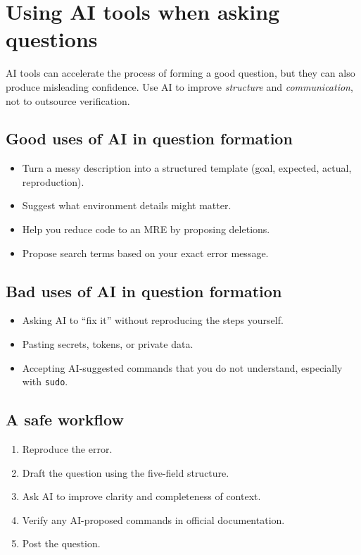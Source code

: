 \section{Using AI tools when asking questions}
AI tools can accelerate the process of forming a good question, but they can also produce misleading confidence. Use AI to improve \emph{structure} and \emph{communication}, not to outsource verification.

\subsection{Good uses of AI in question formation}
\begin{itemize}[noitemsep]
  \item Turn a messy description into a structured template (goal, expected, actual, reproduction).
  \item Suggest what environment details might matter.
  \item Help you reduce code to an MRE by proposing deletions.
  \item Propose search terms based on your exact error message.
\end{itemize}

\subsection{Bad uses of AI in question formation}
\begin{itemize}[noitemsep]
  \item Asking AI to ``fix it'' without reproducing the steps yourself.
  \item Pasting secrets, tokens, or private data.
  \item Accepting AI-suggested commands that you do not understand, especially with \texttt{sudo}.
\end{itemize}

\subsection{A safe workflow}
\begin{enumerate}[noitemsep]
  \item Reproduce the error.
  \item Draft the question using the five-field structure.
  \item Ask AI to improve clarity and completeness of context.
  \item Verify any AI-proposed commands in official documentation.
  \item Post the question.
\end{enumerate}

